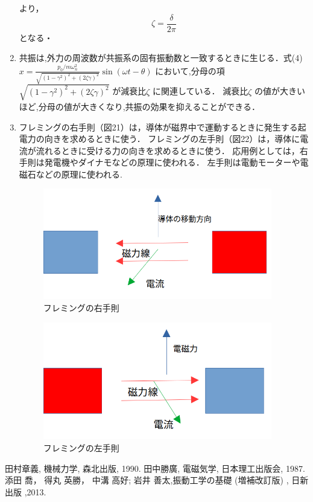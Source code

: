 \documentclass[a4paper,10.5pt]{jsarticle}
\begin{document}
\begin{enumerate}
  より，
  \begin{equation}
    \zeta = {\dfrac{\delta}{{2\pi}}}
  \end{equation}
  となる・
  \item 共振は,外力の周波数が共振系の固有振動数と一致するときに生じる．式(4)
    $x = \frac{{p_0/m\omega_n^2}}{{\sqrt{{(1-\gamma^2)^2+(2\zeta\gamma)^2}}}}\sin(\omega{t}-\theta)$
  において,分母の項 $\sqrt{{(1-\gamma^2)^2+(2\zeta\gamma)^2}} $
  が減衰比$\zeta$ に関連している．
  減衰比$\zeta$ の値が大きいほど,分母の値が大きくなり,共振の効果を抑えることができる．
  \item 
  フレミングの右手則（図21）は，導体が磁界中で運動するときに発生する起電力の向きを求めるときに使う．
  フレミングの左手則（図22）は，導体に電流が流れるときに受ける力の向きを求めるときに使う．
  応用例としては，右手則は発電機やダイナモなどの原理に使われる．
  左手則は電動モーターや電磁石などの原理に使われる. 
  \newpage
  \begin{figure}[h]
    \centering
    \includegraphics[width=10cm]{12.png}
    \caption{フレミングの右手則}
  \end{figure}
  \begin{figure}[h]
    \centering
    \includegraphics[width=10cm]{13.png}
    \caption{フレミングの左手則}
  \end{figure}
\end{enumerate}

\begin{thebibliography}{20}
  \bibitem{} 
  田村章義, 機械力学, 森北出版, 1990.
  \bibitem{}
  田中勝廣, 電磁気学, 日本理工出版会, 1987.
  \bibitem{}
  添田 喬， 得丸 英勝， 中溝 高好; 岩井 善太,振動工学の基礎 (増補改訂版)  , 日新出版 ,2013. 
 \end{thebibliography}
\end{document}

